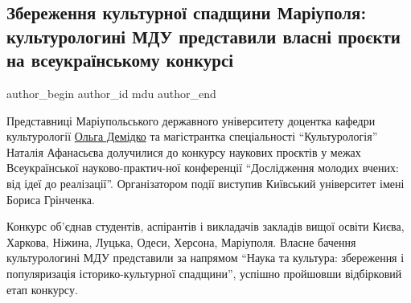  
 
 
 
 
 
\subsection{Збереження культурної спадщини Маріуполя: культурологині МДУ представили власні проєкти на всеукраїнському конкурсі}
\label{sec:25_04_2023.stz.edu.ua.mdu.1.zber_kult_spadschyny_mrpl_demidko_afanasieva}
 
\ifcmt
 author_begin
   author_id mdu
 author_end
\fi


Представниці Маріупольського державного університету доцентка кафедри
культурології \href{\urlDemidkoIA}{Ольга Демідко} та магістрантка спеціальності \enquote{Культурологія}
Наталія Афанасьєва долучилися до конкурсу наукових проєктів у межах
Всеукраїнської науково-практич\hyp{}ної конференції \enquote{Дослідження молодих вчених: від
ідеї до реалізації}. Організатором події виступив Київський університет імені
Бориса Грінченка.


Конкурс об'єднав студентів, аспірантів і викладачів закладів вищої освіти
Києва, Харкова, Ніжина, Луцька, Одеси, Херсона, Маріуполя. Власне бачення
культурологині МДУ представили за напрямом \enquote{Наука та культура: збереження і
популяризація історико-культурної спадщини}, успішно пройшовши відбірковий етап
конкурсу.

